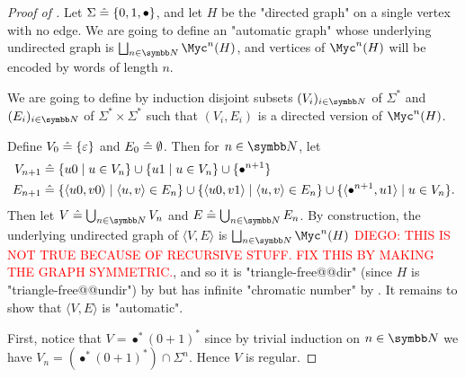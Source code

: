 \begin{proof}[Proof of ]
  Let $\Sigma \mathrel{\hat{=}} \{0,1,\bullet\}$, and let $H$ be the "directed
  graph" on a single vertex with no edge.
  We are going to define an "automatic graph" whose underlying undirected graph
  is $\bigdcup_{n\in\N} \Myc^n(H)$, and vertices of $\Myc^n(H)$ will be
  encoded by words of length $n$.

  We are going to define by induction
  disjoint subsets $(V_i)_{i\in\N}$ of $\Sigma^*$
  and $(E_i)_{i\in\N}$ of $\Sigma^* \times \Sigma^*$ such that
  $(V_i, E_i)$ is a directed version of $\Myc^n(H)$.

  Define $V_0 \mathrel{\hat{=}} \{\varepsilon\}$ and $E_0 \mathrel{\hat{=}} \emptyset$.
  Then for $n \in \N$, let
  \begin{align*}
    V_{n+1} & \mathrel{\hat{=}} \{u0\mid u \in V_n\}\cup \{u1\mid u \in V_n\}\cup\{\bullet^{n+1}\}\\
    E_{n+1} & \mathrel{\hat{=}} \{\langle u0,v0\rangle \mid \langle u,v\rangle \in E_n\}
      \cup \{\langle u0,v1\rangle \mid \langle u,v\rangle \in E_n\}
      \cup \{\langle \bullet^{n+1}, u1\rangle \mid u\in V_n\}.
  \end{align*}
  Then let $V \defeq \bigcup_{n\in \N} V_n$ and $E \defeq \bigcup_{n\in \N} E_n$.
  By construction, the underlying undirected graph of $\langle V,E\rangle$ is
  $\bigdcup_{n\in\N} \Myc^n(H)$ \textcolor{red}{DIEGO: THIS IS NOT TRUE BECAUSE OF RECURSIVE STUFF. FIX THIS BY MAKING THE GRAPH SYMMETRIC.}, and so it is "triangle-free@@dir" (since $H$ is "triangle-free@@undir") by  but has infinite
  "chromatic number" by . 
  It remains to show that $\langle V,E\rangle$ is "automatic".

  First, notice that $V = \bullet^*(0+1)^*$ since by trivial induction
  on $n\in\N$ we have $V_n = (\bullet^*(0+1)^*)\cap \Sigma^n$. Hence $V$ is regular.


\end{proof}
